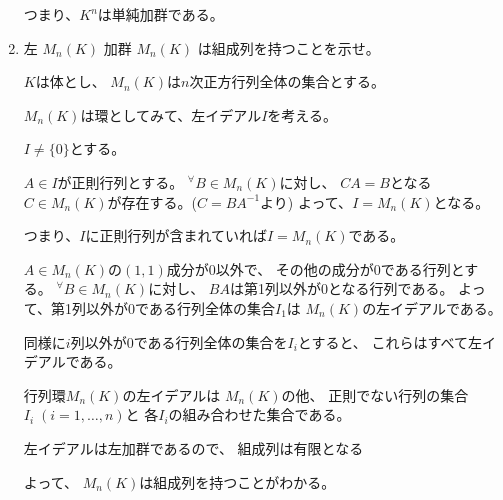 \documentclass[12pt,b5paper]{ltjsarticle}
\begin{document}
\begin{enumerate}
      つまり、$K^{n}$は単純加群である。

      \hrulefill

 \item
      左 $M_{n}(K)$ 加群 $M_{n}(K)$ は組成列を持つことを示せ。

      \dotfill

      $K$は体とし、
      $M_{n}(K)$は$n$次正方行列全体の集合とする。

      $M_{n}(K)$は環としてみて、左イデアル$I$を考える。

      $I\ne\{0\}$とする。

      $A\in I$が正則行列とする。
      ${}^{\forall}B\in M_{n}(K)$に対し、
      $CA=B$となる$C\in M_{n}(K)$が存在する。($C=BA^{-1}$より)
      よって、$I=M_{n}(K)$となる。

      つまり、$I$に正則行列が含まれていれば$I=M_{n}(K)$である。


      $A\in M_{n}(K)$の$(1,1)$成分が0以外で、
      その他の成分が0である行列とする。
      ${}^{\forall}B\in M_{n}(K)$に対し、
      $BA$は第1列以外が0となる行列である。
      よって、第1列以外が0である行列全体の集合$I_{1}$は
      $M_{n}(K)$の左イデアルである。

      同様に$i$列以外が0である行列全体の集合を$I_{i}$とすると、
      これらはすべて左イデアルである。

      行列環$M_{n}(K)$の左イデアルは
      $M_{n}(K)$の他、
      正則でない行列の集合$I_{i}\;(i=1,\dots,n)$と
      各$I_{i}$の組み合わせた集合である。

      左イデアルは左加群であるので、
      組成列は有限となる




      よって、
      $M_{n}(K)$は組成列を持つことがわかる。

      \hrulefill
\end{enumerate}

\hrulefill
\end{document}
